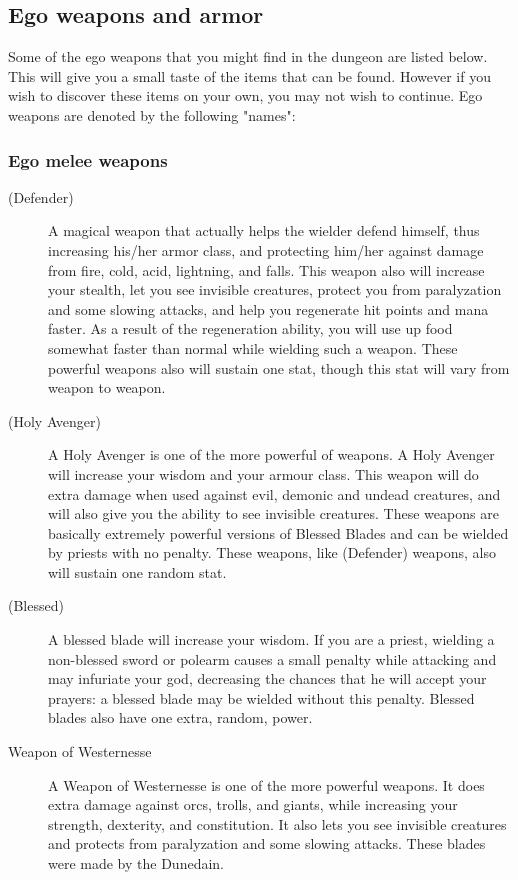\subsection{Ego weapons and armor}
Some of the ego weapons that you might find in the dungeon are listed below.
This will give you a small taste of the items that can be found. However if
you wish to discover these items on your own, you may not wish to continue.
Ego weapons are denoted by the following "names":

\subsubsection{Ego melee weapons}
\begin{description}
\item[(Defender)]
     A magical weapon that actually helps the wielder defend himself, thus
     increasing his/her armor class, and protecting him/her against damage
     from fire, cold, acid, lightning, and falls. This weapon also will
     increase your stealth, let you see invisible creatures, protect you
     from paralyzation and some slowing attacks, and help you regenerate hit
     points and mana faster. As a result of the regeneration ability, you
     will use up food somewhat faster than normal while wielding such a
     weapon. These powerful weapons also will sustain one stat, though this
     stat will vary from weapon to weapon.

\item[(Holy Avenger)]
     A Holy Avenger is one of the more powerful of weapons. A Holy Avenger
     will increase your wisdom and your armour class. This weapon will do
     extra damage when used against evil, demonic and undead creatures, and
     will also give you the ability to see invisible creatures. These
     weapons are basically extremely powerful versions of Blessed Blades
     and can be wielded by priests with no penalty. These weapons, like
     (Defender) weapons, also will sustain one random stat.

\item[(Blessed)]
     A blessed blade will increase your wisdom. If you are a priest,
     wielding a non-blessed sword or polearm causes a small penalty while
     attacking and may infuriate your god, decreasing the chances that he
     will accept your prayers: a blessed blade may be wielded without
     this penalty. Blessed blades also have one extra, random, power.

\item[Weapon of Westernesse]
     A Weapon of Westernesse is one of the more powerful weapons. It does
     extra damage against orcs, trolls, and giants, while increasing your
     strength, dexterity, and constitution. It also lets you see invisible
     creatures and protects from paralyzation and some slowing attacks.
     These blades were made by the Dunedain.


\end{description}
